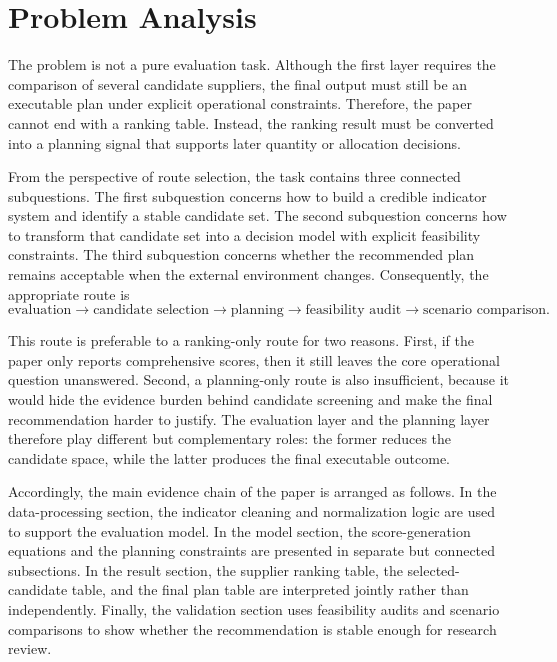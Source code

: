 \section{Problem Analysis}

The problem is not a pure evaluation task. Although the first layer requires the comparison of several candidate suppliers, the final output must still be an executable plan under explicit operational constraints. Therefore, the paper cannot end with a ranking table. Instead, the ranking result must be converted into a planning signal that supports later quantity or allocation decisions.

From the perspective of route selection, the task contains three connected subquestions. The first subquestion concerns how to build a credible indicator system and identify a stable candidate set. The second subquestion concerns how to transform that candidate set into a decision model with explicit feasibility constraints. The third subquestion concerns whether the recommended plan remains acceptable when the external environment changes. Consequently, the appropriate route is
\[
\text{evaluation} \rightarrow \text{candidate selection} \rightarrow \text{planning} \rightarrow \text{feasibility audit} \rightarrow \text{scenario comparison}.
\]

This route is preferable to a ranking-only route for two reasons. First, if the paper only reports comprehensive scores, then it still leaves the core operational question unanswered. Second, a planning-only route is also insufficient, because it would hide the evidence burden behind candidate screening and make the final recommendation harder to justify. The evaluation layer and the planning layer therefore play different but complementary roles: the former reduces the candidate space, while the latter produces the final executable outcome.

Accordingly, the main evidence chain of the paper is arranged as follows. In the data-processing section, the indicator cleaning and normalization logic are used to support the evaluation model. In the model section, the score-generation equations and the planning constraints are presented in separate but connected subsections. In the result section, the supplier ranking table, the selected-candidate table, and the final plan table are interpreted jointly rather than independently. Finally, the validation section uses feasibility audits and scenario comparisons to show whether the recommendation is stable enough for research review.

